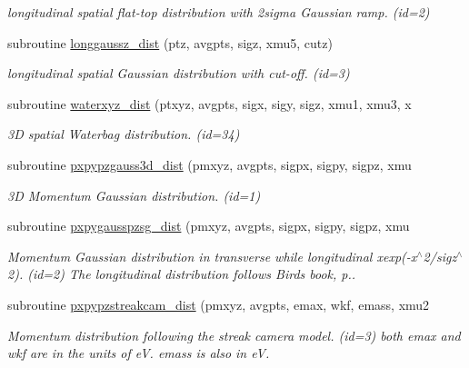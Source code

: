 \begin{DoxyCompactItemize}
\begin{DoxyCompactList}\small\item\em longitudinal spatial flat-\/top distribution with 2sigma Gaussian ramp. (id=2) \end{DoxyCompactList}\item 
subroutine \mbox{\hyperlink{namespacedistributionclass_ab34be02e18a0166b3b2c945e0f68b9ca}{longgaussz\+\_\+dist}} (ptz, avgpts, sigz, xmu5, cutz)
\begin{DoxyCompactList}\small\item\em longitudinal spatial Gaussian distribution with cut-\/off. (id=3) \end{DoxyCompactList}\item 
subroutine \mbox{\hyperlink{namespacedistributionclass_a2b070800bac220b6560be536eaa0d780}{waterxyz\+\_\+dist}} (ptxyz, avgpts, sigx, sigy, sigz, xmu1, xmu3, x
\begin{DoxyCompactList}\small\item\em 3D spatial Waterbag distribution. (id=34) \end{DoxyCompactList}\item 
subroutine \mbox{\hyperlink{namespacedistributionclass_a93a16b51a7754d6ec2c99d0a8c4f5ced}{pxpypzgauss3d\+\_\+dist}} (pmxyz, avgpts, sigpx, sigpy, sigpz, xmu
\begin{DoxyCompactList}\small\item\em 3D Momentum Gaussian distribution. (id=1) \end{DoxyCompactList}\item 
subroutine \mbox{\hyperlink{namespacedistributionclass_ab6dde242aa247f41d9581455e84607fb}{pxpygausspzsg\+\_\+dist}} (pmxyz, avgpts, sigpx, sigpy, sigpz, xmu
\begin{DoxyCompactList}\small\item\em Momentum Gaussian distribution in transverse while longitudinal xexp(-\/x$^\wedge$2/sigz$^\wedge$2). (id=2) The longitudinal distribution follows Bird\textquotesingle{}s book, p.. \end{DoxyCompactList}\item 
subroutine \mbox{\hyperlink{namespacedistributionclass_a323470431d5dda05b3dd2ba27cf8565c}{pxpypzstreakcam\+\_\+dist}} (pmxyz, avgpts, emax, wkf, emass, xmu2
\begin{DoxyCompactList}\small\item\em Momentum distribution following the streak camera model. (id=3) both emax and wkf are in the units of eV. emass is also in eV. \end{DoxyCompactList}\item 

\end{DoxyCompactItemize}
